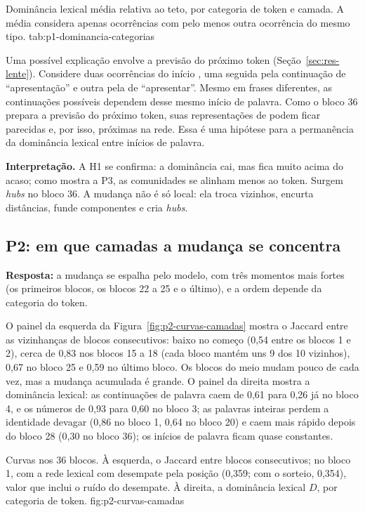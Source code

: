     {Dominância lexical média relativa ao teto, por categoria de token e camada. A média considera
    apenas ocorrências com pelo menos outra ocorrência do mesmo tipo.}
    {tab:p1-dominancia-categorias}

Uma possível explicação envolve a previsão do próximo token (Seção~\ref{sec:res-lente}). Considere
duas ocorrências do início , uma seguida pela continuação de ``apresentação'' e
outra pela de ``apresentar''. Mesmo em frases diferentes, as continuações possíveis dependem desse
mesmo início de palavra. Como o bloco 36 prepara a previsão do próximo token, suas representações
de  podem ficar parecidas e, por isso, próximas na rede. Essa é uma hipótese
para a permanência da dominância lexical entre inícios de palavra.

\textbf{Interpretação.} A H1 se confirma: a dominância cai, mas fica muito acima do acaso;
como mostra a P3, as comunidades se alinham menos ao token. Surgem \emph{hubs} no bloco 36.
A mudança não é só local: ela troca vizinhos, encurta distâncias, funde componentes e cria
\emph{hubs}.

\subsection{P2: em que camadas a mudança se concentra}\label{sec:res-p2}

\textbf{Resposta:} a mudança se espalha pelo modelo, com três momentos mais fortes (os
primeiros blocos, os blocos 22 a 25 e o último), e a ordem depende da categoria do token.

O painel da esquerda da Figura~\ref{fig:p2-curvas-camadas} mostra o Jaccard entre as
vizinhanças de blocos consecutivos: baixo no começo (0,54 entre os blocos 1 e 2), cerca de 0,83
nos blocos 15 a 18 (cada bloco mantém uns 9 dos 10 vizinhos), 0,67 no bloco 25 e 0,59 no último
bloco. Os blocos do meio mudam pouco de cada vez, mas a mudança acumulada é grande. O painel da
direita mostra a dominância lexical: as continuações de palavra caem de 0,61 para 0,26 já no
bloco 4, e os números de 0,93 para 0,60 no bloco 3; as palavras inteiras perdem a identidade
devagar (0,86 no bloco 1, 0,64 no bloco 20) e caem mais rápido depois do bloco 28 (0,30 no
bloco 36); os inícios de palavra ficam quase constantes.

    {Curvas nos 36 blocos. À esquerda, o Jaccard entre blocos consecutivos; no bloco 1, com a
    rede lexical com desempate pela posição (0,359; com o sorteio, 0,354), valor que inclui o
    ruído do desempate. À direita, a dominância lexical $D$, por categoria de token.}
    {fig:p2-curvas-camadas}

